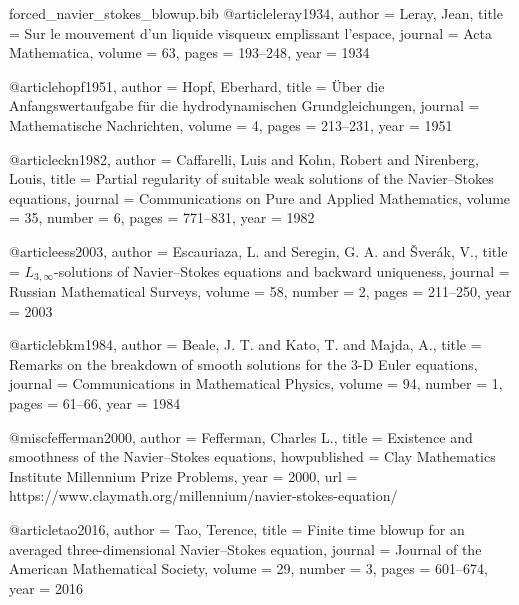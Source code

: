 %
\begin{filecontents*}{forced_navier_stokes_blowup.bib}
@article{leray1934,
  author  = {Leray, Jean},
  title   = {Sur le mouvement d'un liquide visqueux emplissant l'espace},
  journal = {Acta Mathematica},
  volume  = {63},
  pages   = {193--248},
  year    = {1934}
}

@article{hopf1951,
  author  = {Hopf, Eberhard},
  title   = {{\"U}ber die Anfangswertaufgabe f{\"u}r die hydrodynamischen Grundgleichungen},
  journal = {Mathematische Nachrichten},
  volume  = {4},
  pages   = {213--231},
  year    = {1951}
}

@article{ckn1982,
  author  = {Caffarelli, Luis and Kohn, Robert and Nirenberg, Louis},
  title   = {Partial regularity of suitable weak solutions of the {N}avier--{S}tokes equations},
  journal = {Communications on Pure and Applied Mathematics},
  volume  = {35},
  number  = {6},
  pages   = {771--831},
  year    = {1982}
}

@article{ess2003,
  author  = {Escauriaza, L. and Seregin, G. A. and {\v{S}}ver{\'a}k, V.},
  title   = {{$L_{3,\infty}$}-solutions of {N}avier--{S}tokes equations and backward uniqueness},
  journal = {Russian Mathematical Surveys},
  volume  = {58},
  number  = {2},
  pages   = {211--250},
  year    = {2003}
}

@article{bkm1984,
  author  = {Beale, J. T. and Kato, T. and Majda, A.},
  title   = {Remarks on the breakdown of smooth solutions for the {$3$-D} {E}uler equations},
  journal = {Communications in Mathematical Physics},
  volume  = {94},
  number  = {1},
  pages   = {61--66},
  year    = {1984}
}

@misc{fefferman2000,
  author       = {Fefferman, Charles L.},
  title        = {Existence and smoothness of the {N}avier--{S}tokes equations},
  howpublished = {Clay Mathematics Institute Millennium Prize Problems},
  year         = {2000},
  url          = {https://www.claymath.org/millennium/navier-stokes-equation/}
}

@article{tao2016,
  author  = {Tao, Terence},
  title   = {Finite time blowup for an averaged three-dimensional {N}avier--{S}tokes equation},
  journal = {Journal of the American Mathematical Society},
  volume  = {29},
  number  = {3},
  pages   = {601--674},
  year    = {2016}
}


\end{filecontents*}
